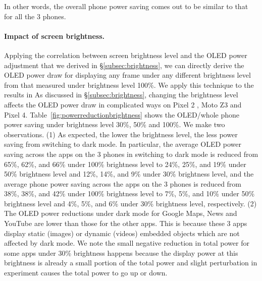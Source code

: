 In other words, 
the overall phone power saving comes out to
be similar to that for all the 3 phones.
%




\paragraph{Impact of screen brightness.}
Applying the correlation between screen brightness level and the OLED
power adjustment that we derived in
\S\ref{subsec:brightness}, we can directly derive the OLED power draw
for displaying any frame under any different brightness level from
that measured under brightness level 100\%.
We apply this technique to the results in
\fi
As discussed in \S\ref{subsec:brightness}, changing the brightness level
  affects the OLED power draw in complicated ways on Pixel 2 , Moto Z3 and Pixel 4.
  Table~\ref{fig:powerreductionbrightness}
  shows the OLED/whole phone power saving under brightness level 30\%, 50\%
  and 100\%.
We make two observations.
(1) As expected, the lower the brightness level, the less power saving from switching
to  dark mode. In particular, 
the average OLED power saving across the apps on the 3 phones
in switching to dark mode is reduced
from 65\%, 62\%, and 66\% under 100\% brightness level
to 24\%, 25\%, and 19\% under 50\% brightness level
and 12\%, 14\%, and 9\% under 30\% brightness level,
and the average phone power saving across the apps on the 3 phones
is reduced
from 38\%, 38\%, and 42\% under 100\% brightness level
to 7\%, 5\%, and 10\% under 50\% brightness level
and 4\%, 5\%, and 6\% under 30\% brightness level, respectively.
(2) The OLED power reductions under dark mode for Google Maps, News and YouTube 
are lower than those for the other apps. This is because these 3 apps
display static (images) or dynamic (videos) embedded objects %
which are not affected by dark mode.
We note the small negative reduction in total power for some apps under 30\% brightness
happens because the display power at this brightness is already a small portion
of the total power and slight perturbation in experiment causes the total power to go up or down.


